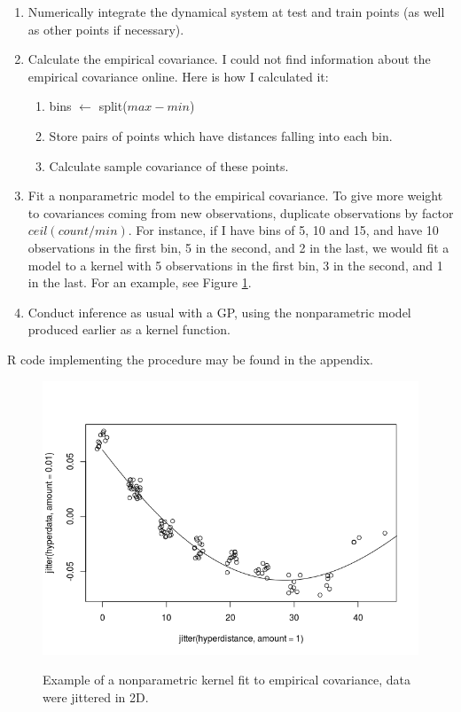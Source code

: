 \documentclass{article}
\begin{document}
	\begin{enumerate}
		\item Numerically integrate the dynamical system at test and train points (as well as other points if necessary).
		\item Calculate the empirical covariance. I could not find information about the empirical covariance online. Here is how I calculated it:
		
		\begin{enumerate}
			\item bins $\gets$ split($max - min$)
			\item Store pairs of points which have distances falling into each bin.
			\item Calculate sample covariance of these points.
		\end{enumerate}
		
		\item Fit a nonparametric model to the empirical covariance. To give more weight to covariances coming from new observations, duplicate observations by factor $ceil(count / min)$. For instance, if I have bins of 5, 10 and 15, and have 10 observations in the first bin, 5 in the second, and 2 in the last, we would fit a model to a kernel with 5 observations in the first bin, 3 in the second, and 1 in the last. For an example, see Figure \ref{fig1}.
		
		\item Conduct inference as usual with a GP, using the nonparametric model produced earlier as a kernel function.
		
	\end{enumerate}
	
	R code implementing the procedure may be found in the appendix.
	
	\begin{figure}[h]
		
		\caption{Example of a nonparametric kernel fit to empirical covariance, data were jittered in 2D.}
		\includegraphics[scale=0.6]{FinalImage1.png}
		\label{fig1}
	\end{figure}
	
\end{document}
